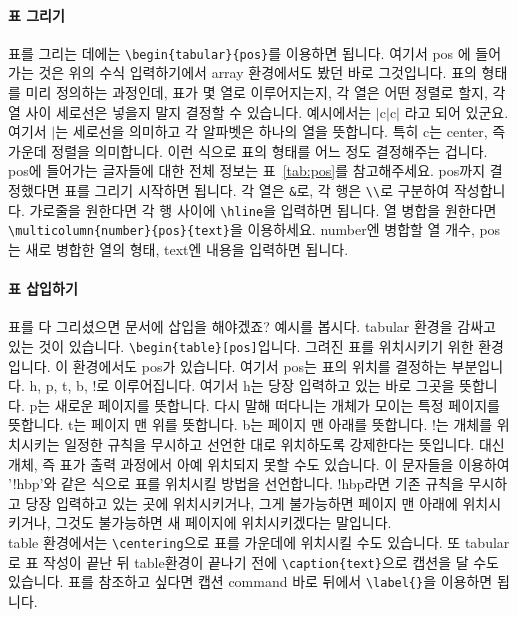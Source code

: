 \paragraph{표 그리기}
표를 그리는 데에는 \verb|\begin{tabular}{pos}|를 이용하면 됩니다.
여기서 pos 에 들어가는 것은 위의 수식 입력하기에서 array 환경에서도 봤던 바로 그것입니다.
표의 형태를 미리 정의하는 과정인데, 표가 몇 열로 이루어지는지, 각 열은 어떤 정렬로 할지, 각 열 사이 세로선은 넣을지 말지 결정할 수 있습니다. 예시에서는 $\mid$c$\mid$c$\mid$ 라고 되어 있군요.
여기서 $\mid$는 세로선을 의미하고 각 알파벳은 하나의 열을 뜻합니다.
특히 c는 center, 즉 가운데 정렬을 의미합니다.
이런 식으로 표의 형태를 어느 정도 결정해주는 겁니다.
pos에 들어가는 글자들에 대한 전체 정보는 표~\ref{tab:pos}를 참고해주세요.
pos까지 결정했다면 표를 그리기 시작하면 됩니다.
각 열은 \verb|&|로, 각 행은 \verb|\\|로 구분하여 작성합니다.
가로줄을 원한다면 각 행 사이에 \verb|\hline|을 입력하면 됩니다.
열 병합을 원한다면 \verb|\multicolumn{number}{pos}{text}|을 이용하세요.
number엔 병합할 열 개수, pos는 새로 병합한 열의 형태, text엔 내용을 입력하면 됩니다.

\paragraph{표 삽입하기}
표를 다 그리셨으면 문서에 삽입을 해야겠죠?
예시를 봅시다. tabular 환경을 감싸고 있는 것이 있습니다.
\verb|\begin{table}[pos]|입니다.
그려진 표를 위치시키기 위한 환경입니다.
이 환경에서도 pos가 있습니다.
여기서 pos는 표의 위치를 결정하는 부분입니다.
h, p, t, b, !로 이루어집니다.
여기서 h는 당장 입력하고 있는 바로 그곳을 뜻합니다.
p는 새로운 페이지를 뜻합니다. 다시 말해 떠다니는 개체가 모이는 특정 페이지를 뜻합니다.
t는 페이지 맨 위를 뜻합니다.
b는 페이지 맨 아래를 뜻합니다.
!는 개체를 위치시키는 일정한 규칙을 무시하고 선언한 대로 위치하도록 강제한다는 뜻입니다.
대신 개체, 즉 표가 출력 과정에서 아예 위치되지 못할 수도 있습니다.
이 문자들을 이용하여 '!hbp'와 같은 식으로 표를 위치시킬 방법을 선언합니다.
!hbp라면 기존 규칙을 무시하고 당장 입력하고 있는 곳에 위치시키거나, 그게 불가능하면 페이지 맨 아래에 위치시키거나, 그것도 불가능하면 새 페이지에 위치시키겠다는 말입니다.\\
table 환경에서는 \verb|\centering|으로 표를 가운데에 위치시킬 수도 있습니다.
또 tabular로 표 작성이 끝난 뒤 table환경이 끝나기 전에 \verb|\caption{text}|으로 캡션을 달 수도 있습니다.
표를 참조하고 싶다면 캡션 command 바로 뒤에서 \verb|\label{}|을 이용하면 됩니다.

